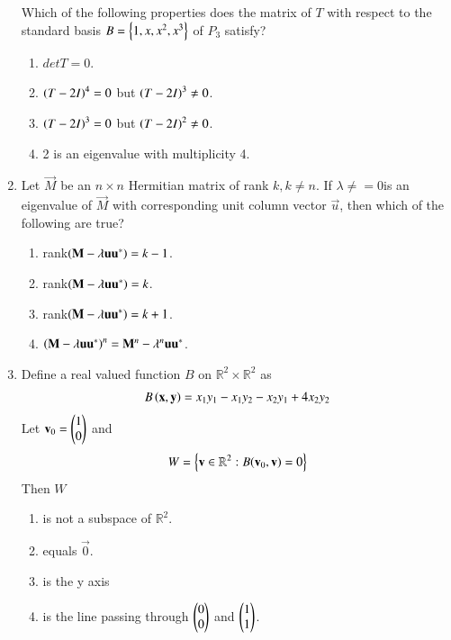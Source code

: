 \begin{enumerate}[label=\thesection.\arabic*.,ref=\thesection.\theenumi]
%
Which of the following properties does the matrix of $T$ with respect to the standard basis
$B = \left\{1,x,x^2,x^3\right\}$ of $P_3$ satisfy?
\begin{enumerate}
\item $det T = 0$.
\item $\left(T-2I\right)^4 = 0$ but $\left(T-2I\right)^3 \ne 0$.
\item $\left(T-2I\right)^3 = 0$ but $\left(T-2I\right)^2 \ne 0$.
\item 2 is an eigenvalue with multiplicity 4.
\end{enumerate}
%
\solution

\item Let $\vec{M}$ be an $n \times n$ Hermitian matrix of rank $k, k \ne n$.  If $\lambda \ne = 0$is an eigenvalue of $\vec{M}$ with corresponding unit column vector $\vec{u}$, then which of the
following are true?
\begin{enumerate}
\item rank$\left(\mathbf{M}- \lambda \mathbf{u}\mathbf{u}^*\right) = k-1$.
\item rank$\left(\mathbf{M}- \lambda \mathbf{u}\mathbf{u}^*\right) = k$.
\item rank$\left(\mathbf{M}- \lambda \mathbf{u}\mathbf{u}^*\right) = k+1$.
\item $\left(\mathbf{M}- \lambda \mathbf{u}\mathbf{u}^*\right)^n = \mathbf{M}^n - \lambda^n \mathbf{u}\mathbf{u}^*$.
\end{enumerate}
%
\solution

\item Define a real valued function $B$ on $\mathbb{R}^2 \times \mathbb{R}^2 $ as 
\begin{align}
B\left(\mathbf{x},\mathbf{y}\right) = x_1y_1 - x_1y_2-x_2y_1+4x_2y_2
\end{align}
Let $\mathbf{v}_0 = \begin{pmatrix}1\\0\end{pmatrix}$ and 
\begin{align}
W = \left\{\mathbf{v} \in \mathbb{R}^2: B(\mathbf{v}_0,\mathbf{v}) =0\right\}
\end{align}
Then $W$
\begin{enumerate}
\item is not a subspace of $\mathbb{R}^2$.
\item equals $\vec{0}$.
\item is the y axis
\item is the line passing through $\begin{pmatrix}0 \\ 0\end{pmatrix}$ and $\begin{pmatrix}1 \\ 1\end{pmatrix}$.
\end{enumerate}
%
\solution


\end{enumerate}
